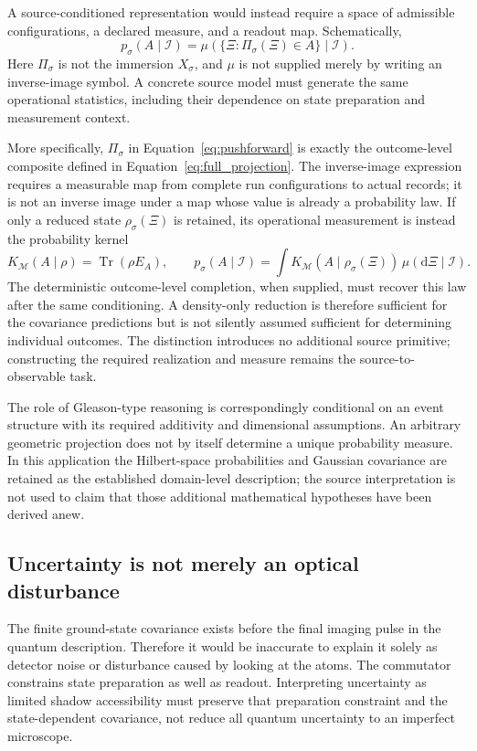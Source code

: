 \documentclass[11pt,a4paper]{article}
\theoremstyle{definition}
\theoremstyle{remark}
\newcommand{\dd}{\mathrm{d}}
\newcommand{\Tr}{\operatorname{Tr}}
\begin{document}
A source-conditioned representation would instead require a space of admissible configurations, a declared measure, and a readout map. Schematically,
\begin{equation}
 p_\sigma(A\mid\mathcal I)
 =\mu\!\left(\{\Xi:\Pi_\sigma(\Xi)\in A\}\mid\mathcal I\right).
 \label{eq:pushforward}
\end{equation}
Here $\Pi_\sigma$ is not the immersion $X_\sigma$, and $\mu$ is not supplied merely by writing an inverse-image symbol. A concrete source model must generate the same operational statistics, including their dependence on state preparation and measurement context.\cite{born,foundation}

More specifically, $\Pi_\sigma$ in Equation~\eqref{eq:pushforward} is exactly the outcome-level composite defined in Equation~\eqref{eq:full_projection}. The inverse-image expression requires a measurable map from complete run configurations to actual records; it is not an inverse image under a map whose value is already a probability law. If only a reduced state $\rho_\sigma(\Xi)$ is retained, its operational measurement is instead the probability kernel
\[
 K_{\mathcal M}(A\mid\rho)=\Tr(\rho E_A),\qquad
 p_\sigma(A\mid\mathcal I)
 =\int K_{\mathcal M}(A\mid\rho_\sigma(\Xi))
       \,\mu(\dd\Xi\mid\mathcal I).
\]
The deterministic outcome-level completion, when supplied, must recover this law after the same conditioning. A density-only reduction is therefore sufficient for the covariance predictions but is not silently assumed sufficient for determining individual outcomes. The distinction introduces no additional source primitive; constructing the required realization and measure remains the source-to-observable task.\cite{born,foundation}

The role of Gleason-type reasoning is correspondingly conditional on an event structure with its required additivity and dimensional assumptions. An arbitrary geometric projection does not by itself determine a unique probability measure. In this application the Hilbert-space probabilities and Gaussian covariance are retained as the established domain-level description; the source interpretation is not used to claim that those additional mathematical hypotheses have been derived anew.\cite{born}

\subsection{Uncertainty is not merely an optical disturbance}
The finite ground-state covariance exists before the final imaging pulse in the quantum description. Therefore it would be inaccurate to explain it solely as detector noise or disturbance caused by looking at the atoms. The commutator constrains state preparation as well as readout. Interpreting uncertainty as limited shadow accessibility must preserve that preparation constraint and the state-dependent covariance, not reduce all quantum uncertainty to an imperfect microscope.\cite{zhang2026,weedbrook,born}
\end{document}
